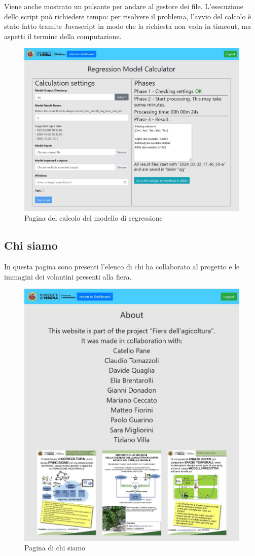 Viene anche mostrato un pulsante per andare al gestore dei file.\newline
L'esecuzione dello script può richiedere tempo: per risolvere il problema, l'avvio del calcolo è stato fatto tramite
Javascript in modo che la richiesta non vada in timeout, ma aspetti il termine della computazione.
\begin{figure}[htp]
    \centering
    \includegraphics[width=0.7\linewidth]{images/chapter4-flask-regression.jpg}
    \caption{Pagina del calcolo del modello di regressione}
\end{figure}

\newpage
\subsection{Chi siamo}
\label{secsub:flask-funzionalità-about}
In questa pagina sono presenti l'elenco di chi ha collaborato al progetto e le immagini dei volantini presenti alla fiera.
\begin{figure}[htp]
    \centering
    \includegraphics[width=0.7\linewidth]{images/chapter4-flask-about.jpg}
    \caption{Pagina di chi siamo}
\end{figure}

